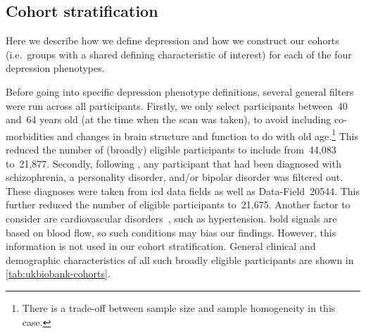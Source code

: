 \subsection{Cohort stratification}\label{subsec:cohort-stratification}

Here we describe how we define depression and how we construct our cohorts (i.e.~groups with a shared defining characteristic of interest) for each of the four depression phenotypes.

Before going into specific depression phenotype definitions, several general filters were run across all participants.
%
Firstly, we only select participants between~40 and~64 years old (at the time when the scan was taken), to avoid including co-morbidities and changes in brain structure and function to do with old age.\footnote{There is a trade-off between sample size and sample homogeneity in this case.}
This reduced the number of (broadly) eligible participants to include from~44,083 to~21,877.
Secondly, following \textcite{Howard2020}, any participant that had been diagnosed with schizophrenia, a personality disorder, and/or bipolar disorder was filtered out.
These diagnoses were taken from \gls{icd} data fields as well as Data-Field~20544.
This further reduced the number of eligible participants to~21,675.
Another factor to consider are cardiovascular disorders~\parencite{Whooley2013}, such as hypertension.
\Gls{bold} signals are based on blood flow, so such conditions may bias our findings.
However, this information is not used in our cohort stratification.
General clinical and demographic characteristics of all such broadly eligible participants are shown in \cref{tab:ukbiobank-cohorts}.


